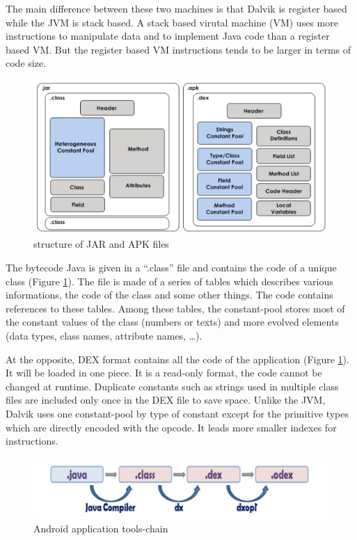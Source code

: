 \documentclass{sig-alternate}
\def \DALVIK{Dalvik\xspace}
\def \ANDROID{Android\xspace}
\def \JVM{JVM\xspace}
\def \DEX{DEX\xspace}
\begin{document}
      The main difference between these two machines is that \DALVIK is register based while the \JVM is stack based.
      A stack based virutal machine (VM) uses more instructions to manipulate data and to implement Java code than a register based VM.
      But the register based VM instructions tends to be larger in terms of code size\cite{ieee-paul-kundu-energy-perspective}.

      \begin{figure}[!h]
        \centering \includegraphics[width=\columnwidth]{structure-jar-apk.png}
        \caption{structure of JAR and APK files}
        \label{SJA}
      \end{figure}

      The bytecode Java is given in a ``.class'' file and contains the code of a unique class (Figure \ref{SJA}).
      The file is made of a series of tables which describes various informations, the code of the class and some other things.
      The code contains references to these tables.
      Among these tables, the constant-pool stores most of the constant values of the class (numbers or texts)
      and more evolved elements (data types, class names, attribute names, \dots).

      At the opposite, \DEX format contains all the code of the application (Figure \ref{SJA}).
      It will be loaded in one piece.
      It is a read-only format, the code cannot be changed at runtime.
      Duplicate constants such as strings used in multiple class files
      are included only once in the \DEX file to save space.
      Unlike the \JVM, \DALVIK uses one constant-pool by type of constant
      except for the primitive types which are directly encoded with the opcode.
      It leads more smaller indexes for instructions.\\

      \begin{figure}[!h]
        \centering \includegraphics[width=\columnwidth]{dex-tools-chain.png}
        \caption{\ANDROID application tools-chain}
        \label{DTC}
      \end{figure}
\end{document}
